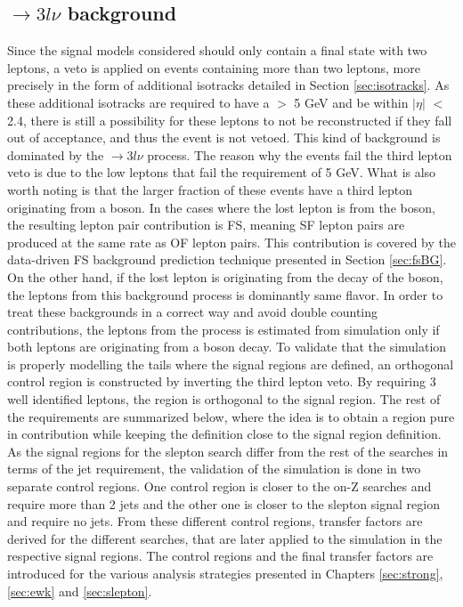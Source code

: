 \subsection*{\PWZ$\rightarrow3l\nu$ background}
\noindent
\justify
Since the signal models considered should only contain a final state with two leptons, a veto is applied on events containing more than two leptons, more precisely in the form of additional isotracks
 detailed in Section \ref{sec:isotracks}. 
As these additional isotracks are required to have a \pt $>$ 5 GeV and be within $|\eta|$ $<$ 2.4, there is still a possibility for these leptons to not be reconstructed if they fall out of acceptance, and thus the event is not vetoed. 
This kind of background is dominated by the \PWZ$\rightarrow3l\nu$ process.
The reason why the events fail the third lepton veto is due to the low \pt leptons that fail the \pt requirement of 5 GeV. 
What is also worth noting is that the larger fraction of these events have a third lepton originating from a \PZ boson. 
In the cases where the lost lepton is from the \PZ boson, the resulting lepton pair contribution is FS, meaning SF lepton pairs are produced at the same rate as OF lepton pairs. 
This contribution is covered by the data-driven FS background prediction technique presented in Section \ref{sec:fsBG}.
On the other hand, if the lost lepton is originating from the decay of the \PW boson, the leptons from this background process is dominantly same flavor. 
In order to treat these backgrounds in a correct way and avoid double counting contributions, the leptons from the \PWZ process is estimated from simulation only if both leptons are originating from a \PZ boson decay. 
\newpara
\noindent\justify
To validate that the simulation is properly modelling the \ptmiss tails where the signal regions are defined, an orthogonal control region is constructed by inverting the third lepton veto. 
By requiring 3 well identified leptons, the region is orthogonal to the signal region. 
The rest of the requirements are summarized below, where the idea is to obtain a region pure in \PWZ contribution while keeping the definition close to the signal region definition. 
As the signal regions for the slepton search differ from the rest of the searches in terms of the jet requirement, the validation of the \PWZ simulation is done in two separate control regions. 
One control region is closer to the on-Z searches and require more than 2 jets and the other one is closer to the slepton signal region and require no jets. 
From these different control regions, transfer factors are derived for the different searches, that are later applied to the simulation in the respective signal regions. 
The control regions and the final transfer factors are introduced for the various analysis strategies presented in Chapters \ref{sec:strong}, \ref{sec:ewk} and \ref{sec:slepton}. 
